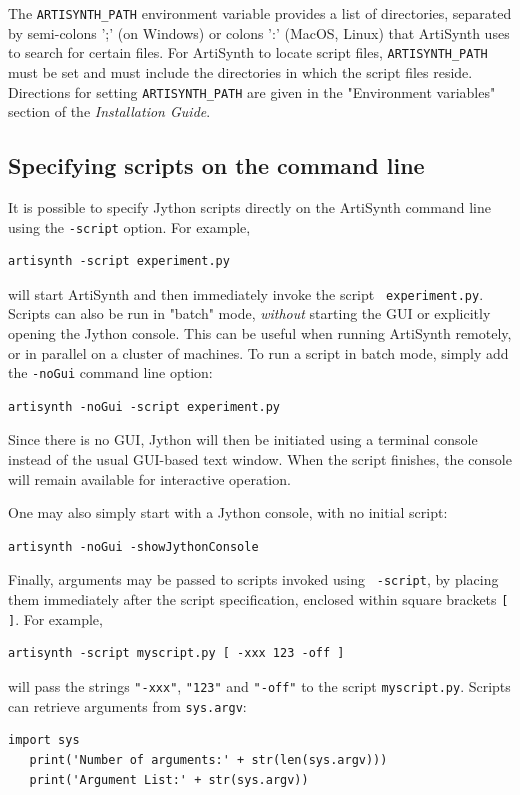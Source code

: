 \documentclass{article}
\begin{document}
\begin{sideblock}
The {\tt ARTISYNTH\_PATH} environment variable provides a list of
directories, separated by semi-colons ';' (on Windows) or colons ':'
(MacOS, Linux) that ArtiSynth uses to search for certain files.  For
ArtiSynth to locate script files, {\tt ARTISYNTH\_PATH} must be set
and must include the directories in which the script files reside.
Directions for setting {\tt ARTISYNTH\_PATH} are given in the
"Environment variables" section of the {\it Installation Guide}.
\end{sideblock}

\subsection{Specifying scripts on the command line}
\label{JythonBatchScripting:sec}

It is possible to specify Jython scripts directly on the ArtiSynth
command line using the {\tt -script} option. For example,
%
\begin{lstlisting}[]
   artisynth -script experiment.py
\end{lstlisting}
%
will start ArtiSynth and then immediately invoke the script {\tt
experiment.py}. Scripts can also be run in "batch" mode, {\it without}
starting the GUI or explicitly opening the Jython console.  This can
be useful when running ArtiSynth remotely, or in parallel on a cluster
of machines. To run a script in batch mode, simply 
add the {\tt -noGui} command line option:
%
\begin{lstlisting}[]
   artisynth -noGui -script experiment.py
\end{lstlisting}
%
Since there is no GUI, Jython will then be initiated using a terminal
console instead of the usual GUI-based text window. When the script
finishes, the console will remain available for interactive operation.

One may also simply start with a Jython console, with no initial script:
%
\begin{lstlisting}[]
   artisynth -noGui -showJythonConsole
\end{lstlisting}
%

Finally, arguments may be passed to scripts invoked using {\tt
-script}, by placing them immediately after the script specification,
enclosed within square brackets {\tt [ ]}. For example,
%
\begin{lstlisting}[]
   artisynth -script myscript.py [ -xxx 123 -off ]
\end{lstlisting}
%
will pass the strings {\tt "-xxx"}, {\tt "123"} and {\tt "-off"} to
the script {\tt myscript.py}. Scripts can retrieve arguments from
{\tt sys.argv}:
%
\begin{lstlisting}[]
   import sys
   print('Number of arguments:' + str(len(sys.argv)))
   print('Argument List:' + str(sys.argv)) 
\end{lstlisting}
%
\end{document}
